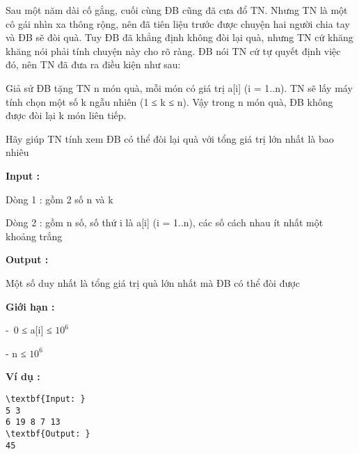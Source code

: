 

Sau một năm dài cố gắng, cuối cùng ĐB cũng đã cưa đổ TN. Nhưng TN là một cô gái nhìn xa thông rộng, nên đã tiên liệu trước được chuyện hai người chia tay và ĐB sẽ đòi quà. Tuy ĐB đã khẳng định không đòi lại quà, nhưng TN cứ khăng khăng nói phải tính chuyện này cho rõ ràng. ĐB nói TN cứ tự quyết định việc đó, nên TN đã đưa ra điều kiện như sau:

Giả sử ĐB tặng TN n món quà, mỗi món có giá trị a[i] (i = 1..n). TN sẽ lấy máy tính chọn một số k ngẫu nhiên (1 ≤ k ≤ n). Vậy trong n món quà, ĐB không được đòi lại k món liên tiếp.

Hãy giúp TN tính xem ĐB có thể đòi lại quà với tổng giá trị lớn nhất là bao nhiêu

\textbf{Input : }

Dòng 1 : gồm 2 số n và k

Dòng 2 : gồm n số, số thứ i là a[i] (i = 1..n), các số cách nhau ít nhất một khoảng trắng

\textbf{Output : }

Một số duy nhất là tổng giá trị quà lớn nhất mà ĐB có thể đòi được

\textbf{Giới hạn : }

- 0 ≤ a[i] ≤ $10^{6}$

- n ≤ $10^{6}$

\textbf{Ví dụ : }
\begin{verbatim}
\textbf{Input: }
5 3
6 19 8 7 13
\textbf{Output: }
45\end{verbatim}
